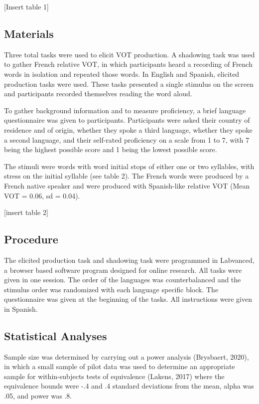 \documentclass[
  english,
  man]{apa6}
\begin{document}
{[}Insert table 1{]}

\hypertarget{materials}{%
\subsection{Materials}\label{materials}}

Three total tasks were used to elicit VOT production.
A shadowing task was used to gather French relative VOT, in which participants heard a recording of French words in isolation and repeated those words.
In English and Spanish, elicited production tasks were used.
These tasks presented a single stimulus on the screen and participants recorded themselves reading the word aloud.

To gather background information and to measure proficiency, a brief language questionnaire was given to participants.
Participants were asked their country of residence and of origin, whether they spoke a third language, whether they spoke a second language, and their self-rated proficiency on a scale from 1 to 7, with 7 being the highest possible score and 1 being the lowest possible score.

The stimuli were words with word initial stops of either one or two syllables, with stress on the initial syllable (see table 2).
The French words were produced by a French native speaker and were produced with Spanish-like relative VOT (Mean VOT = 0.06, sd = 0.04).

{[}insert table 2{]}

\hypertarget{procedure}{%
\subsection{Procedure}\label{procedure}}

The elicited production task and shadowing task were programmed in Labvanced, a browser based software program designed for online research.
All tasks were given in one session.
The order of the languages was counterbalanced and the stimulus order was randomized with each language specific block.
The questionnaire was given at the beginning of the tasks.
All instructions were given in Spanish.

\hypertarget{statistical-analyses}{%
\subsection{Statistical Analyses}\label{statistical-analyses}}

Sample size was determined by carrying out a power analysis (Brysbaert, 2020), in which a small sample of pilot data was used to determine an appropriate sample for within-subjects tests of equivalence (Lakens, 2017) where the equivalence bounds were -.4 and .4 standard deviations from the mean, alpha was .05, and power was .8.
\end{document}
